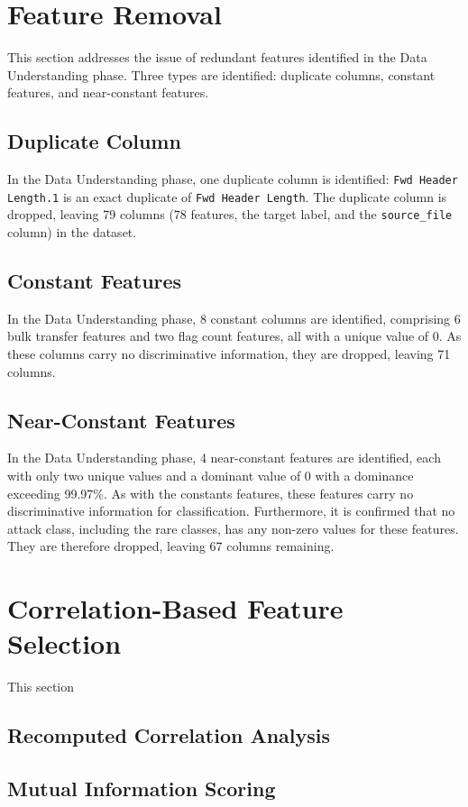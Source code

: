 \documentclass[12pt,a4paper]{article}
\begin{document}
\section{Feature Removal}
This section addresses the issue of redundant features identified in the Data Understanding phase. Three types are identified: duplicate columns, constant features, and near-constant features.
\subsection{Duplicate Column}
In the Data Understanding phase, one duplicate column is identified: \texttt{Fwd Header Length.1} is an exact duplicate of \texttt{Fwd Header Length}. The duplicate column is dropped, leaving 79 columns (78 features, the target label, and the \texttt{source\_file} column) in the dataset.
\subsection{Constant Features}
In the Data Understanding phase, 8 constant columns are identified, comprising 6 bulk transfer features and two flag count features, all with a unique value of 0. As these columns carry no discriminative information, they are dropped, leaving 71 columns.
\subsection{Near-Constant Features}
In the Data Understanding phase, 4 near-constant features are identified, each with only two unique values and a dominant value of 0 with a dominance exceeding 99.97\%. As with the constants features, these features carry no discriminative information for classification. Furthermore, it is confirmed that no attack class, including the rare classes, has any non-zero values for these features. They are therefore dropped, leaving 67 columns remaining. 
\section{Correlation-Based Feature Selection}
This section 
\subsection{Recomputed Correlation Analysis}

\subsection{Mutual Information Scoring}
\end{document}
